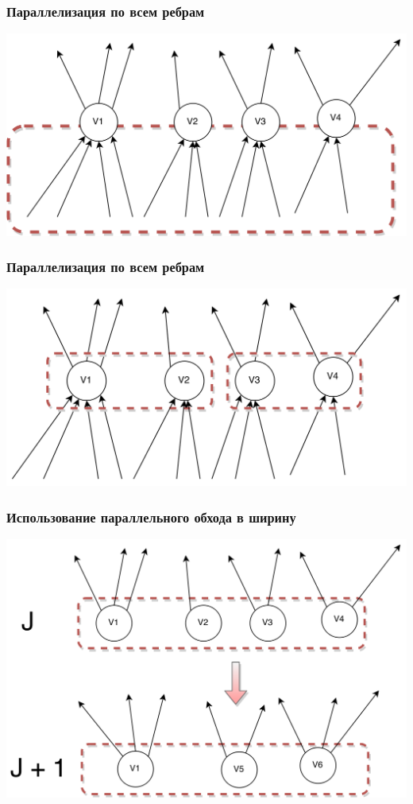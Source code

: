 \documentclass[10pt, compress]{beamer}
\begin{document}
\begin{frame}[fragile]
  \frametitle{Параллелизация по всем ребрам}
  {\vspace{-2em}\begin{center}\includegraphics[width=\textwidth]{images/bf_par_2_1.png}\end{center}}
\end{frame}
\begin{frame}[fragile]
  \frametitle{Параллелизация по всем ребрам}
  {\vspace{-2em}\begin{center}\includegraphics[width=\textwidth]{images/bf_par_2_2.png}\end{center}}
\end{frame}

\begin{frame}[fragile]
  \frametitle{Использование параллельного обхода в ширину}
  {\vspace{-2em}\begin{center}\includegraphics[width=\textwidth]{images/bf_par_3.png}\end{center}}
\end{frame}
\end{document}
